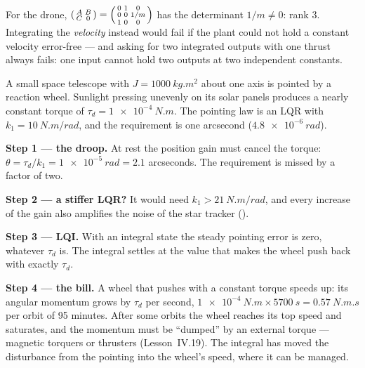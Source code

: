 For the drone, $\begin{psmallmatrix} A & B\\ C & 0\end{psmallmatrix} = \begin{psmallmatrix} 0 & 1 & 0\\ 0 & 0 & 1/m\\ 1 & 0 & 0\end{psmallmatrix}$ has the determinant $1/m \ne 0$: rank 3. Integrating the \emph{velocity} instead would fail if the plant could not hold a constant velocity error-free — and asking for two integrated outputs with one thrust always fails: one input cannot hold two outputs at two independent constants.

\begin{example}
\label{ex:lqi-sat}
A small space telescope with $J = \SI{1000}{kg.m^2}$ about one axis is pointed by a reaction wheel. Sunlight pressing unevenly on its solar panels produces a nearly constant torque of $\tau_d = \SI{1e-4}{N.m}$. The pointing law is an LQR with $k_1 = \SI{10}{N.m/rad}$, and the requirement is one arcsecond ($\SI{4.8e-6}{rad}$).

\textbf{Step 1 — the droop.} At rest the position gain must cancel the torque: $\theta = \tau_d/k_1 = \SI{1e-5}{rad} = 2.1$ arcseconds. The requirement is missed by a factor of two.

\textbf{Step 2 — a stiffer LQR?} It would need $k_1 > \SI{21}{N.m/rad}$, and every increase of the gain also amplifies the noise of the star tracker ().

\textbf{Step 3 — LQI.} With an integral state the steady pointing error is zero, whatever $\tau_d$ is. The integral settles at the value that makes the wheel push back with exactly $\tau_d$.

\textbf{Step 4 — the bill.} A wheel that pushes with a constant torque speeds up: its angular momentum grows by $\tau_d$ per second, $\SI{1e-4}{N.m} \times \SI{5700}{s} = \SI{0.57}{N.m.s}$ per orbit of 95 minutes. After some orbits the wheel reaches its top speed and saturates, and the momentum must be \enquote{dumped} by an external torque — magnetic torquers or thrusters (Lesson~IV.19). The integral has moved the disturbance from the pointing into the wheel's speed, where it can be managed.
\end{example}

